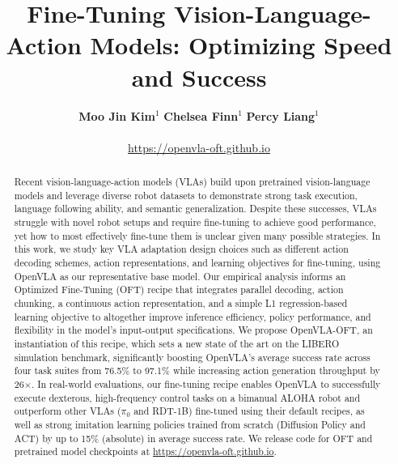 \documentclass[conference]{IEEEtran}
\begin{document}


\title{Fine-Tuning Vision-Language-Action Models: Optimizing Speed and Success}


\newcommand{\website}{\url{https://openvla-oft.github.io}}

\author{
  \textbf{Moo Jin Kim}$^{1}$ \;\; \textbf{Chelsea Finn}$^{1}$ \;\; \textbf{Percy Liang}$^{1}$\\\\
  \large\website
}


\maketitle






\begin{abstract}
Recent vision-language-action models (VLAs) build upon pretrained vision-language models and leverage diverse robot datasets to demonstrate strong task execution, language following ability, and semantic generalization. Despite these successes, VLAs struggle with novel robot setups and require fine-tuning to achieve good performance, yet how to most effectively fine-tune them is unclear given many possible strategies. In this work, we study key VLA adaptation design choices such as different action decoding schemes, action representations, and learning objectives for fine-tuning, using OpenVLA as our representative base model. Our empirical analysis informs an Optimized Fine-Tuning (OFT) recipe that integrates parallel decoding, action chunking, a continuous action representation, and a simple L1 regression-based learning objective to altogether improve inference efficiency, policy performance, and flexibility in the model's input-output specifications. We propose OpenVLA-OFT, an instantiation of this recipe, which sets a new state of the art on the LIBERO simulation benchmark, significantly boosting OpenVLA's average success rate across four task suites from 76.5\% to 97.1\% while increasing action generation throughput by 26$\times$. In real-world evaluations, our fine-tuning recipe enables OpenVLA to successfully execute dexterous, high-frequency control tasks on a bimanual ALOHA robot and outperform other VLAs ($\pi_0$ and RDT-1B) fine-tuned using their default recipes, as well as strong imitation learning policies trained from scratch (Diffusion Policy and ACT) by up to 15\% (absolute) in average success rate.
We release code for OFT and pretrained model checkpoints at \website.
\end{abstract}
\end{document}
